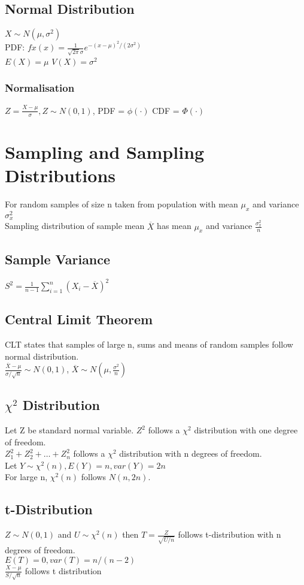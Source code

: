\documentclass[10pt]{article}
\begin{document}
\subsection*{Normal Distribution}
$X \sim N(\mu, \sigma^2)$\\
PDF: $fx(x) = \frac{1}{\sqrt{2\pi}\sigma}e^{-(x-\mu)^2/(2\sigma^2)}$\\
$E(X) = \mu$ $V(X) = \sigma^2$
\subsubsection*{Normalisation}
$Z = \frac{X - \mu}{\sigma}, Z \sim N(0,1)$, PDF = $\phi(\cdot)$ CDF = $\Phi(\cdot)$

\section*{Sampling and Sampling Distributions}
For random samples of size n taken from population with mean $\mu_x$ and variance $\sigma^2_x$\\
Sampling distribution of sample mean $\overline{X}$ has mean $\mu_x$ and variance $\frac{\sigma^2_x}{n}$
\subsection*{Sample Variance}
$S^2 = \frac{1}{n-1}\sum_{i=1}^n (X_i - \overline{X})^2$
\subsection*{Central Limit Theorem}
CLT states that samples of large n, sums and means of random samples follow normal distribution.\\
$\frac{\overline{X} - \mu}{\sigma / \sqrt{n}} \sim N(0,1)$, 
$\overline{X} \sim N(\mu,\frac{\sigma^2}{n})$
\subsection*{$\chi^2$ Distribution}
Let Z be standard normal variable. $Z^2$ follows a $\chi^2$ distribution with one degree of freedom. \\
$Z_1^2 + Z_2^2 + \ldots + Z_n^2$ follows a $\chi^2$ distribution with n degrees of freedom.
\\
Let $Y \sim \chi^2(n), E(Y) = n, var(Y) = 2n$ \\
For large n, $\chi^2(n)$ follows $N(n,2n)$.
\subsection*{t-Distribution}
$Z \sim N(0,1)$ and $U \sim \chi^2(n)$ then $T = \frac{Z}{\sqrt{U/n}}$ follows t-distribution with n degrees of freedom.
\\ $E(T) = 0, var(T) = n/(n-2)$
\\ $\frac{X - \mu}{S/\sqrt{n}} $ follows t distribution
\end{document}
